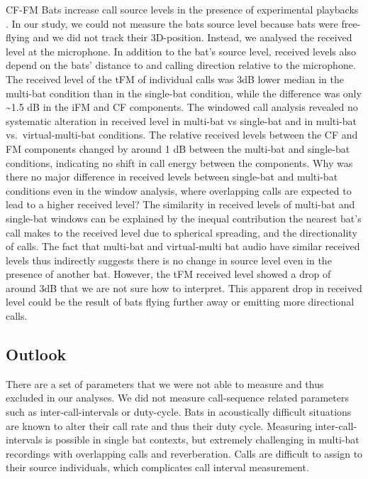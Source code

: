 \documentclass[
]{book}
\begin{document}
CF-FM Bats increase call source levels in the presence of experimental playbacks \citep{hage2013ambient, hage2014ambient, lu2020echolocating}. In our study, we could not measure the bats source level because bats were free-flying and we did not track their 3D-position. Instead, we analysed the received level at the microphone. In addition to the bat's source level, received levels also depend on the bats' distance to and calling direction relative to the microphone. The received level of the tFM of individual calls was 3dB lower median in the multi-bat condition than in the single-bat condition, while the difference was only \textasciitilde1.5 dB in the iFM and CF components. The windowed call analysis revealed no systematic alteration in received level in multi-bat vs single-bat and in multi-bat vs.~virtual-multi-bat conditions. The relative received levels between the CF and FM components changed by around 1 dB between the multi-bat and single-bat conditions, indicating no shift in call energy between the components. Why was there no major difference in received levels between single-bat and multi-bat conditions even in the window analysis, where overlapping calls are expected to lead to a higher received level? The similarity in received levels of multi-bat and single-bat windows can be explained by the inequal contribution the nearest bat's call makes to the received level due to spherical spreading, and the directionality of calls. The fact that multi-bat and virtual-multi bat audio have similar received levels thus indirectly suggests there is no change in source level even in the presence of another bat. However, the tFM received level showed a drop of around 3dB that we are not sure how to interpret. This apparent drop in received level could be the result of bats flying further away or emitting more directional calls.

\hypertarget{outlook}{%
\subsection{Outlook}\label{outlook}}

There are a set of parameters that we were not able to measure and thus excluded in our analyses. We did not measure call-sequence related parameters such as inter-call-intervals or duty-cycle. Bats in acoustically difficult situations are known to alter their call rate \citep{amichai2015a, jarvis2013a} and thus their duty cycle. Measuring inter-call-intervals is possible in single bat contexts, but extremely challenging in multi-bat recordings with overlapping calls and reverberation. Calls are difficult to assign to their source individuals, which complicates call interval measurement.
\end{document}
